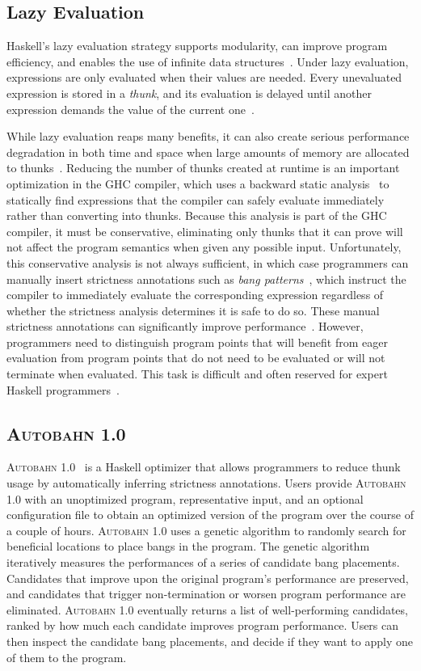 \documentclass[format=sigplan, review=true]{acmart}
\newcommand{\Ao}[0]{\textsc{Autobahn 1.0}}
\begin{document}
\subsection{Lazy Evaluation}
Haskell's lazy evaluation strategy supports modularity, can improve
program efficiency, and enables the use of infinite data
structures~\cite{Hughes89}. Under lazy evaluation, expressions are
only evaluated when their values are needed. Every unevaluated
expression is stored in a \textit{thunk}, and its evaluation is
delayed until another expression demands the value of the current
one~\cite{PeytonJones89}. 

While lazy evaluation reaps many benefits, it can also create serious
performance degradation in both time and space when large amounts of
memory are allocated to thunks~\cite{Jones94,Santos98,Ennals03}.
Reducing the number of thunks created at runtime is an important
optimization in the GHC compiler, which uses a backward static
analysis~\cite{Sergey14} to statically find expressions that the
compiler can safely evaluate immediately rather than converting into
thunks.  Because this analysis is part of the GHC compiler, it must be
conservative, eliminating only thunks that it can prove will not
affect the program semantics when given any possible input.
Unfortunately, this conservative analysis is not always sufficient, in
which case programmers can manually insert strictness annotations such
as \textit{bang patterns}~\cite{bang}, which instruct the compiler to
immediately evaluate the corresponding expression regardless of
whether the strictness analysis determines it is safe to do so.  These
manual strictness annotations can significantly improve
performance~\cite[Chapter~25]{rwh}. However, programmers need to
distinguish program points that will benefit from eager evaluation
from program points that do not need to be evaluated or will not
terminate when evaluated. This task is difficult and often reserved
for expert Haskell programmers~\cite{Mitchell13}.

\subsection{\Ao}

\Ao~\cite{autobahn-wang} is a Haskell optimizer that allows programmers to
reduce thunk usage by automatically inferring strictness
annotations. Users provide \Ao{} with an unoptimized
program, representative input, and an optional configuration file to
obtain an optimized version of the program over the course of a couple
of hours.
\Ao{} uses a genetic algorithm to randomly search for
beneficial locations to place bangs in the program. The genetic
algorithm iteratively measures the performances of a series of
candidate bang placements. Candidates that improve upon the original
program's performance are preserved, and candidates that trigger
non-termination or worsen program performance are
eliminated. \Ao{} eventually returns a list
of well-performing candidates, ranked by how much each candidate
improves program performance. Users can then inspect the candidate
bang placements, and decide if they want to apply one of them to the
program.
\end{document}
